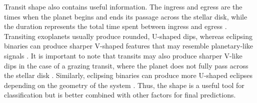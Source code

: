 Transit shape also contains useful information. The ingress and egress are the times when the planet begins and ends its passage across the stellar disk, while the duration represents the total time spent between ingress and egress \citep{2010exop.book...55W}. Transiting exoplanets usually produce rounded, U-shaped dips, whereas eclipsing binaries can produce sharper V-shaped features that may resemble planetary-like signals \citep{2010exop.book...55W}. It is important to note that transits may also produce sharper V-like dips in the case of a grazing transit, where the planet does not fully pass across the stellar disk \citep{2013A&A...557A.139S}. Similarly, eclipsing binaries can produce more U-shaped eclipses depending on the geometry of the system \citep{2017MNRAS.465.2634A}. Thus, the shape is a useful tool for classification but is better combined with other factors for final predictions.